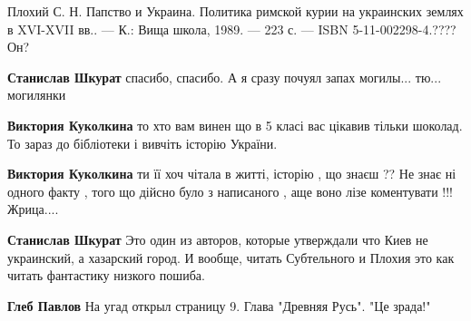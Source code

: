 \begin{itemize}
\begin{itemize}
Плохий С. Н. Папство и Украина. Политика римской курии на украинских землях в
XVI-XVII вв.. — К.: Вища школа, 1989. — 223 с. — ISBN 5-11-002298-4.???? Он?

 
\textbf{Станислав Шкурат} спасибо, спасибо. А я сразу почуял запах могилы... тю... могилянки \Smiley[1.0][yellow]

 
\textbf{Виктория Куколкина} то хто вам винен що в 5 класі вас цікавив тільки шоколад. То зараз до бібліотеки і вивчіть історію України.

 
\textbf{Виктория Куколкина} ти її хоч чітала в житті, історію , що знаєш ?? Не знає ні одного факту , того що дійсно було з написаного , аще воно лізе коментувати !!! Жрица....

 
\textbf{Станислав Шкурат} Это один из авторов, которые утверждали что Киев не украинский, а хазарский город. И вообще, читать Субтельного и Плохия это как читать фантастику низкого пошиба.

 
\textbf{Глеб Павлов} На угад открыл страницу 9. Глава "Древняя Русь". "Це зрада!"


\end{itemize}

 

\end{itemize}
